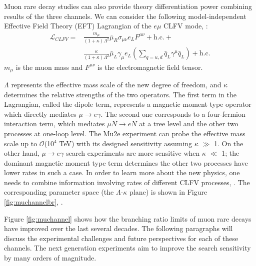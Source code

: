 Muon rare decay studies can also provide theory differentiation power 
combining results of the three channels. We can consider the following model-independent 
Effective Field Theory (EFT) Lagrangian of the $e \mu$ CLFV mode, \cite{doi:10.1146/annurev-nucl-100809-131949}:
\begin{equation}\label{LCF}
\begin{aligned}
\mathscr{L}_{C L F V}= & \frac{m_\mu}{(1+\kappa) \Lambda^2} \bar{\mu}_R \sigma_{\mu \nu} e_L F^{\mu \nu}+\text{h.c.}+ \\
&\frac{\kappa}{(1+\kappa) \Lambda^2} \bar{\mu}_L \gamma_\mu e_L\left(\sum_{q=u, d} \bar{q}_L \gamma^\mu \bar{q}_L\right)+\text{h.c.}
\end{aligned}
\end{equation}
$m_\mu$ is the muon mass and  $F^{\mu \nu}$ is the electromagnetic field tensor.

$\Lambda$ represents the effective mass scale of the new degree of freedom, and $\kappa$
determines the relative strengths of the two operators. The first term in the Lagrangian,
called the dipole term, represents a
magnetic moment type operator which directly mediates $\mu \rightarrow e \gamma$. 
The second one corresponds to a four-fermion interaction term, 
which mediates $\mu N \rightarrow eN$ at a tree level and 
the other two processes at one-loop level.
The Mu2e experiment can probe the effective mass scale up 
to $\mathcal{O}$(10$^4$ TeV) with its designed sensitivity assuming $\kappa$ $\gg$ 1.
On the other hand, $\mu \rightarrow e\gamma$ search experiments 
are more sensitive when $\kappa$ $\ll$ 1; the dominant magnetic
moment type term determines the other two processes have 
lower rates in such a case. In order to learn more about the new
physics, one needs to combine information involving rates 
of different CLFV processes, \cite{osti_1042577}.
The corresponding parameter space (the $\Lambda$-$\kappa$ plane) is shown in 
Figure \ref{fig:muchannelbr}, \cite{doi:10.1146/annurev-nucl-100809-131949}. 

Figure \ref{fig:muchannel} 
shows how the branching ratio limits of muon rare decays
have improved over the last several decades. The following paragraphs 
will discuss the experimental challenges and future perspectives 
for each of these channels. The next generation 
experiments aim to improve the search sensitivity by many orders of magnitude. 

